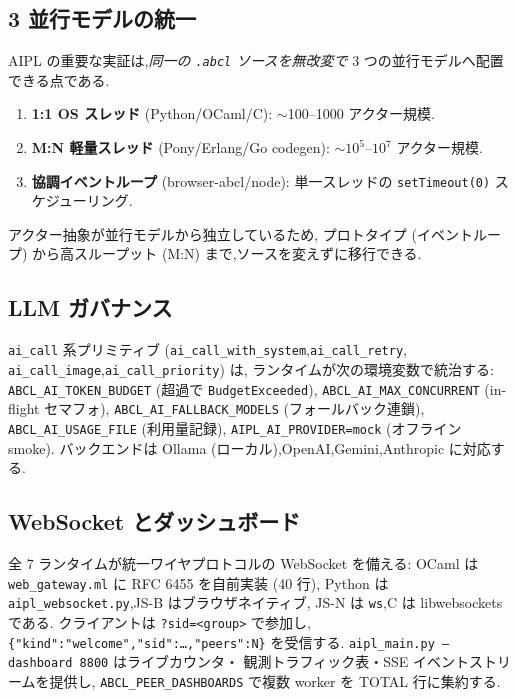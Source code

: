 \documentclass[11pt,a4paper]{article}
\newcommand{\code}[1]{\texttt{\small #1}}
\begin{document}
\subsection{3 並行モデルの統一}
AIPL の重要な実証は,\emph{同一の \code{.abcl} ソースを無改変で}
3 つの並行モデルへ配置できる点である.
\begin{enumerate}[leftmargin=1.6em,itemsep=2pt]
  \item \textbf{1:1 OS スレッド} (Python/OCaml/C):
        $\sim$100--1000 アクター規模.
  \item \textbf{M:N 軽量スレッド} (Pony/Erlang/Go codegen):
        $\sim 10^5$--$10^7$ アクター規模.
  \item \textbf{協調イベントループ} (browser-abcl/node):
        単一スレッドの \code{setTimeout(0)} スケジューリング.
\end{enumerate}
アクター抽象が並行モデルから独立しているため,
プロトタイプ (イベントループ) から高スループット
(M:N) まで,ソースを変えずに移行できる.

\subsection{LLM ガバナンス}\label{sec:llm}
\code{ai\_call} 系プリミティブ
(\code{ai\_call\_with\_system},\code{ai\_call\_retry},
\code{ai\_call\_image},\code{ai\_call\_priority}) は,
ランタイムが次の環境変数で統治する:
\code{ABCL\_AI\_TOKEN\_BUDGET} (超過で \code{BudgetExceeded}),
\code{ABCL\_AI\_MAX\_CONCURRENT} (in-flight セマフォ),
\code{ABCL\_AI\_FALLBACK\_MODELS} (フォールバック連鎖),
\code{ABCL\_AI\_USAGE\_FILE} (利用量記録),
\code{AIPL\_AI\_PROVIDER=mock} (オフライン smoke).
バックエンドは Ollama (ローカル),OpenAI,Gemini,Anthropic に対応する.

\subsection{WebSocket とダッシュボード}
全 7 ランタイムが統一ワイヤプロトコルの WebSocket を備える:
OCaml は \code{web\_gateway.ml} に RFC 6455 を自前実装 (40 行),
Python は \code{aipl\_websocket.py},JS-B はブラウザネイティブ,
JS-N は \code{ws},C は libwebsockets である.
クライアントは \code{?sid=<group>} で参加し,
\code{\{"kind":"welcome","sid":\dots,"peers":N\}} を受信する.
\code{aipl\_main.py --dashboard 8800} はライブカウンタ・
観測トラフィック表・SSE イベントストリームを提供し,
\code{ABCL\_PEER\_DASHBOARDS} で複数 worker を TOTAL 行に集約する.

\end{document}
